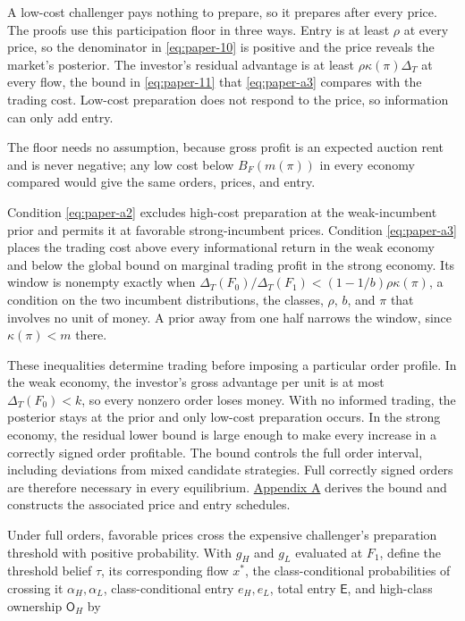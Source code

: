 A low-cost challenger pays nothing to prepare, so it prepares after
every price. The proofs use this participation floor in three ways.
Entry is at least \(\rho\) at every price, so the denominator in
\eqref{eq:paper-10} is positive and the price reveals the market's
posterior. The investor's residual advantage is at least
\(\rho\kappa(\pi)\Delta_T\) at every flow, the bound in
\eqref{eq:paper-11} that \eqref{eq:paper-a3} compares with the trading
cost. Low-cost preparation does not respond to the price, so information
can only add entry.

The floor needs no assumption, because gross profit is an expected
auction rent and is never negative; any low cost below
\(B_F(m(\pi))\) in every economy compared would give the same orders,
prices, and entry.

Condition \eqref{eq:paper-a2} excludes high-cost preparation at the
weak-incumbent prior and permits it at favorable strong-incumbent
prices. Condition \eqref{eq:paper-a3} places the trading cost above
every informational return in the weak economy and below the global
bound on marginal trading profit in the strong economy. Its window is
nonempty exactly when
\(\Delta_T(F_0)/\Delta_T(F_1)<(1-1/b)\rho\kappa(\pi)\), a condition on
the two incumbent distributions, the classes, \(\rho\), \(b\), and
\(\pi\) that involves no unit of money. A prior away from one half
narrows the window, since \(\kappa(\pi)<m\) there.

These inequalities determine trading before imposing a particular order
profile. In the weak economy, the investor's gross advantage per unit is
at most \(\Delta_T(F_0)<k\), so every nonzero order loses money. With no
informed trading, the posterior stays at the prior and only low-cost
preparation occurs. In the strong economy, the residual lower bound is
large enough to make every increase in a correctly signed order
profitable. The bound controls the full order interval, including
deviations from mixed candidate strategies. Full correctly signed orders
are therefore necessary in every equilibrium.
\hyperref[paper-appendix]{Appendix A} derives the bound and constructs
the associated price and entry schedules.

Under full orders, favorable prices cross the expensive challenger's
preparation threshold with positive probability. With \(g_H\) and
\(g_L\) evaluated at \(F_1\), define the threshold belief \(\tau\), its
corresponding flow \(x^*\), the class-conditional probabilities of
crossing it \(\alpha_H,\alpha_L\), class-conditional entry \(e_H,e_L\),
total entry \(\mathsf E\), and high-class ownership \(\mathsf O_H\) by

